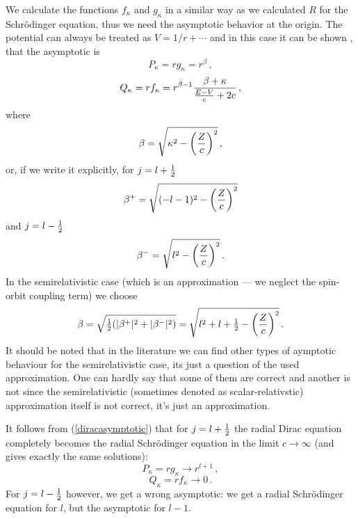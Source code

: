 We calculate the functions $f_\kappa$ and $g_\kappa$ in a similar way as we calculated $R$ for the Schrödinger equation, thus we need the asymptotic behavior at the origin. The potential can always be treated as $V=1/r+\cdots$ and in this case it can be shown \cite{zabloudil}, that the asymptotic is 
\begin{equation*}
  P_\kappa = r g_\kappa=r^{\beta}\,,
\end{equation*}
\begin{equation*}
  Q_\kappa = r f_\kappa=r^{\beta-1}{\beta+\kappa\over{E-V\over c}+2c}\,,
\end{equation*}
where 
\begin{equation}
  \beta=\sqrt{\kappa^2-\left(Z\over c\right)^2}\,,  \label{diracasymptotic}
\end{equation}
or, if we write it explicitly, for $j=l+{\textstyle{1\over2}}$
\begin{equation*}
  \beta^+=\sqrt{(-l-1)^2-\left(Z\over c\right)^2}
\end{equation*}
and $j=l-{\textstyle{1\over2}}$
\begin{equation*}
  \beta^-=\sqrt{l^2-\left(Z\over c\right)^2}\,.
\end{equation*}
In the semirelativistic case (which is an approximation --- we neglect the spin-orbit coupling term) we choose 
\begin{equation*}
  \beta=\sqrt{{\textstyle{1\over2}}(|\beta^+|^2+|\beta^-|^2)}= \sqrt{l^2+l+{\textstyle{1\over2}}-\left(Z\over c\right)^2}\,.
\end{equation*}
It should be noted that in the literature we can find other types of aymptotic behaviour for the semirelativistic case, its just a question of the used approximation. One can hardly say that some of them are correct and another is not since the semirelativistic (sometimes denoted as scalar-relativstic) approximation itself is not correct, it's just an approximation.

It follows from (\ref{diracasymptotic}) that for $j=l+{\textstyle{1\over2}}$ the radial Dirac equation completely becomes the radial Schrödinger equation in the limit $c\to\infty$ (and gives exactly the same solutions): 
\begin{equation*}
  P_\kappa = r g_\kappa \to r^{l+1}\,,
\end{equation*}
\begin{equation*}
  Q_\kappa = r f_\kappa \to 0\,.
\end{equation*}
For $j=l-{\textstyle{1\over2}}$ however, we get a wrong asymptotic: we get a radial Schrödinger equation for $l$, but the asymptotic for $l-1$.

